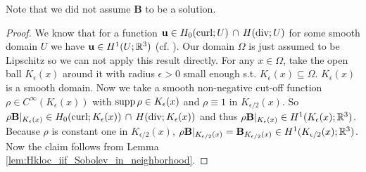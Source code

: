 \documentclass[../master_thesis.tex]{subfiles}
\begin{document}
\noindent Note that we did not assume $\mathbf{B}$ to be a solution.
\begin{proof}
    We know that for a function $\mathbf{u} \in H_0(\operatorname{curl};U) \,\cap \,H(\operatorname{div};U)$ 
    for some smooth domain $U$ we have $\mathbf{u} \in H^1(U;\mathbb{R}^3)$ 
    (cf. \cite[Remark 3.48]{monk}). Our domain $\Omega$ is just assumed to be Lipschitz 
    so we can not apply this result directly. For any $x \in \Omega$,
    take the open ball $K_\epsilon(x)$ around it with radius $\epsilon > 0$ small enough
    s.t. $K_\epsilon(x) \subseteq \Omega$. 
    $K_\epsilon(x)$ is a smooth domain. Now we take a smooth non-negative cut-off function 
    $\rho\in C^\infty({K_\epsilon(x)})$ with $\operatorname{supp} \rho \in K_{\epsilon}(x)$ 
    and $\rho \equiv 1$ in $K_{\epsilon/2}(x)$. So
    $\rho \mathbf{B}|_{K_\epsilon(x)}\in H_0(\operatorname{curl};K_\epsilon(x)) \,\cap \,H(\operatorname{div};K_\epsilon(x))$
    and thus $\rho \mathbf{B}|_{K_\epsilon(x)} \in H^1(K_\epsilon(x);\mathbb{R}^3)$. 
    Because $\rho$ is constant one in ${K_{\epsilon/2}(x)}$,
    $\rho\mathbf{B}|_{K_{\epsilon/2}(x)} = \mathbf{B}_{K_{\epsilon/2}(x)} 
    \in H^1(K_{\epsilon/2}(x);\mathbb{R}^3)$.
    Now the claim follows from 
    Lemma \ref{lem:Hkloc_iif_Sobolev_in_neighborhood}.
\end{proof}
\end{document}
